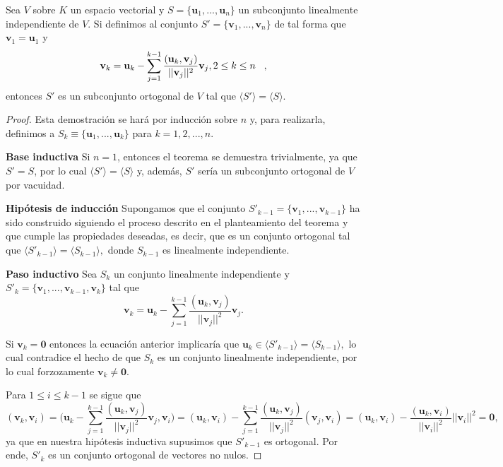 \documentclass[12pt]{article}
\newenvironment{teorema}[2][Teorema]{\begin{trivlist}
\item[\hskip \labelsep {\bfseries #1}\hskip \labelsep {\bfseries #2.}]}{\end{trivlist}}
\begin{document}
\begin{teorema} {4.3.2.1 (Gram-Schmidt)}
    Sea $V$ sobre $K$ un espacio vectorial y $S=\{\mathbf{u}_1, ..., \mathbf{u}_n\}$ un subconjunto linealmente independiente de $V$. Si definimos al conjunto $S'=\{\mathbf{v}_1, ..., \mathbf{v}_n\}$ de tal forma que $\mathbf{v}_1=\mathbf{u}_1$ y $$\mathbf{v}_k=\mathbf{u}_k-\sum_{j=1}^{k-1}\frac{(\mathbf{u}_k,\mathbf{v}_j)}{||\mathbf{v}_j||^2} \mathbf{v}_j,\hspace{3mm 2\leq k\leq n},$$ entonces $S'$ es un subconjunto ortogonal de $V$ tal que $\langle S' \rangle = \langle S \rangle.$

\begin{proof}
    Esta demostración se hará por inducción sobre $n$ y, para realizarla, definimos a $S_k\equiv\{\mathbf{u}_1, ..., \mathbf{u}_k\}$ para $k=1,2, ..., n.$

    \vspace{3mm}
\textbf{Base inductiva}
Si $n=1$, entonces el teorema se demuestra trivialmente, ya que $S'=S$, por lo cual $\langle S' \rangle =\langle S \rangle$ y, además,  $S'$ sería un subconjunto ortogonal de $V$ por vacuidad.

    \vspace{3mm}
\textbf{Hipótesis de inducción}
Supongamos que el conjunto $S'_{k-1}=\{\mathbf{v}_1, ..., \mathbf{v}_{k-1}\}$ ha sido construido siguiendo el proceso descrito en el planteamiento del teorema y que cumple las propiedades deseadas, es decir, que es un conjunto ortogonal tal que $\langle S'_{k-1} \rangle = \langle S_{k-1} \rangle,$ donde $S_{k-1}$ es linealmente independiente.

    \vspace{3mm} 
\textbf{Paso inductivo}
    Sea $S_k$ un conjunto linealmente independiente y $S'_k=\{\mathbf{v}_1, ..., \mathbf{v}_{k-1}, \mathbf{v}_k\}$ tal que $$\mathbf{v}_k=\mathbf{u}_k-\sum_{j=1}^{k-1}\frac{(\mathbf{u}_k,\mathbf{v}_j)}{||\mathbf{v}_j||^2}\mathbf{v}_j.$$

    Si $\mathbf{v}_k=\mathbf{0}$ entonces la ecuación anterior implicaría que $\mathbf{u}_k\in\langle S'_{k-1} \rangle = \langle S_{k-1} \rangle,$ lo cual contradice el hecho de que $S_k$ es un conjunto linealmente independiente, por lo cual forzozamente $\mathbf{v}_k\neq\mathbf{0}.$ 

    Para $1\leq i\leq k-1$ se sigue que $$(\mathbf{v}_k,\mathbf{v}_i)=\big (\mathbf{u}_k-\sum_{j=1}^{k-1}\frac{(\mathbf{u}_k,\mathbf{v}_j)}{||\mathbf{v}_j||^2}\mathbf{v}_j,\mathbf{v}_i \big )=(\mathbf{u}_k,\mathbf{v}_i)-\sum_{j=1}^{k-1}\frac{(\mathbf{u}_k,\mathbf{v}_j)}{||\mathbf{v}_j||^2}(\mathbf{v}_j,\mathbf{v}_i)=(\mathbf{u}_k, \mathbf{v}_i)-\frac{(\mathbf{u}_k,\mathbf{v}_i)}{||\mathbf{v}_i||^2}||\mathbf{v}_i||^2=\mathbf{0},$$ ya que en nuestra hipótesis inductiva supusimos que $S'_{k-1}$ es ortogonal. Por ende, $S'_k$ es un conjunto ortogonal de vectores no nulos.


\end{proof}
\end{teorema}
\end{document}
